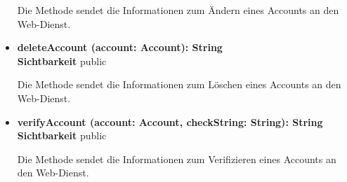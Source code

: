 \begin{itemize}
Die Methode sendet die Informationen zum Ändern eines Accounts an den Web-Dienst.

\item \textbf{deleteAccount (account: Account): String}\hfill\\
\textbf{Sichtbarkeit} public

Die Methode sendet die Informationen zum Löschen eines Accounts an den Web-Dienst.

\item \textbf{verifyAccount (account: Account, checkString: String): String}\hfill\\
\textbf{Sichtbarkeit} public

Die Methode sendet die Informationen zum Verifizieren eines Accounts an den Web-Dienst.

\end{itemize}